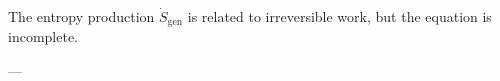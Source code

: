 The entropy production \( \dot{S}_{\text{gen}} \) is related to irreversible work, but the equation is incomplete.

---